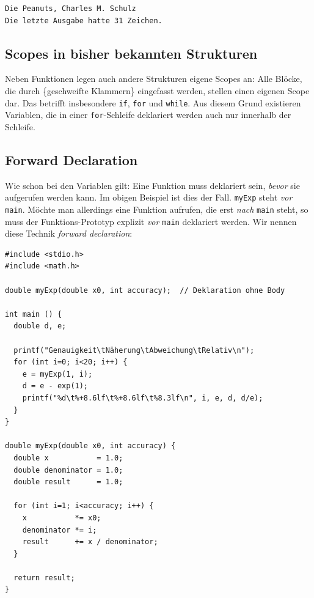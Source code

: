 \begin{cmdbox}
\begin{verbatim}
Die Peanuts, Charles M. Schulz
Die letzte Ausgabe hatte 31 Zeichen.
\end{verbatim}
\end{cmdbox}

\subsection{Scopes in bisher bekannten Strukturen}
Neben Funktionen legen auch andere Strukturen eigene Scopes an: Alle Blöcke, die durch \{geschweifte Klammern\} eingefasst werden, stellen einen eigenen Scope dar. Das betrifft insbesondere \texttt{if}, \texttt{for} und \texttt{while}. Aus diesem Grund existieren Variablen, die in einer \texttt{for}-Schleife deklariert werden auch nur innerhalb der Schleife.

\subsection{Forward Declaration} \label{sec:forwardDeclaration}
Wie schon bei den Variablen gilt: Eine Funktion muss deklariert sein, \emph{bevor} sie aufgerufen werden kann. Im obigen Beispiel ist dies der Fall. \texttt{myExp} steht \emph{vor} \texttt{main}. Möchte man allerdings eine Funktion aufrufen, die erst \emph{nach} \texttt{main} steht, so muss der Funktions-Prototyp explizit \emph{vor} \texttt{main} deklariert werden. Wir nennen diese Technik \emph{forward declaration}:

\begin{codebox}
\begin{verbatim}
#include <stdio.h>
#include <math.h>

double myExp(double x0, int accuracy);  // Deklaration ohne Body

int main () {
  double d, e;

  printf("Genauigkeit\tNäherung\tAbweichung\tRelativ\n");
  for (int i=0; i<20; i++) {
    e = myExp(1, i);
    d = e - exp(1);
    printf("%d\t%+8.6lf\t%+8.6lf\t%8.3lf\n", i, e, d, d/e);
  }
}

double myExp(double x0, int accuracy) {
  double x           = 1.0;
  double denominator = 1.0;
  double result      = 1.0;

  for (int i=1; i<accuracy; i++) {
    x           *= x0;
    denominator *= i;
    result      += x / denominator;
  }

  return result;
}
\end{verbatim}
\end{codebox}


